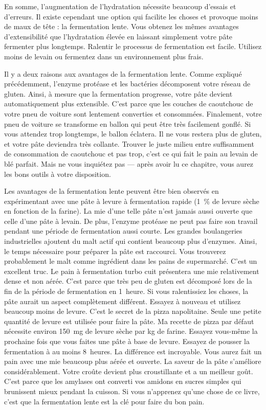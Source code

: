 En somme, l'augmentation de l'hydratation nécessite beaucoup d'essais et d'erreurs. Il existe cependant une option qui facilite les choses et provoque moins de maux de tête : la fermentation lente. Vous obtenez les mêmes avantages d'extensibilité que l'hydratation élevée en laissant simplement votre pâte fermenter plus longtemps.
Ralentir le processus de fermentation est facile. Utilisez moins de levain ou fermentez dans un environnement plus frais.

Il y a deux raisons aux avantages de la fermentation lente.
Comme expliqué précédemment, l'enzyme protéase et les bactéries décomposent votre réseau de gluten. Ainsi, à mesure que la fermentation progresse, votre pâte devient automatiquement plus extensible. C'est parce que les couches de caoutchouc de votre pneu de voiture sont lentement converties et consommées. Finalement, votre pneu de voiture se transforme en ballon qui peut être très facilement gonflé. Si vous attendez trop longtemps, le ballon éclatera. Il ne vous restera plus de gluten, et votre pâte deviendra très collante. Trouver le juste milieu entre suffisamment de consommation de caoutchouc et pas trop, c'est ce qui fait le pain au levain de blé parfait. Mais ne vous inquiétez pas --- après avoir lu ce chapitre, vous aurez les bons outils à votre disposition.

Les avantages de la fermentation lente peuvent être bien observés en expérimentant avec une pâte à levure à fermentation rapide (\qty{1}{\percent} de levure sèche en fonction de la farine). La mie d'une telle pâte n'est jamais aussi ouverte que celle d'une pâte à levain. De plus, l'enzyme protéase ne peut pas faire son travail pendant une période de fermentation aussi courte.
Les grandes boulangeries industrielles ajoutent du malt actif qui contient beaucoup plus d'enzymes. Ainsi, le temps nécessaire pour préparer la pâte est raccourci. Vous trouverez probablement le malt comme ingrédient dans les pains de supermarché. C'est un excellent truc. Le pain à fermentation turbo cuit présentera une mie relativement dense et non aérée. C'est parce que très peu de gluten est décomposé lors de la fin de la période de fermentation en 1~heure. Si vous ralentissiez les choses, la pâte aurait un aspect complètement différent.
Essayez à nouveau et utilisez beaucoup moins de levure. C'est le secret de la pizza napolitaine. Seule une petite quantité de levure est utilisée pour faire la pâte. Ma recette de pizza par défaut nécessite environ \qty{150}{\mg} de levure sèche par \unit{\kg} de farine. Essayez vous-même la prochaine fois que vous faites une pâte à base de levure. Essayez de pousser la fermentation à au moins 8~heures.
La différence est incroyable. Vous aurez fait un pain avec une mie beaucoup plus aérée et ouverte. La saveur de la pâte s'améliore considérablement. Votre croûte devient plus croustillante et a un meilleur goût. C'est parce que les amylases ont converti vos amidons en sucres simples qui brunissent mieux pendant la cuisson.
Si vous n'apprenez qu'une chose de ce livre, c'est que la fermentation lente est la clé pour faire du bon pain.

